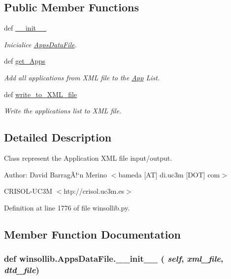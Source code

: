 \subsection*{Public Member Functions}
\begin{CompactItemize}
\item 
def \hyperlink{classwinsollib_1_1AppsDataFile_c1fe263619352c8a85a48a3ba16a60e2}{\_\-\_\-init\_\-\_\-}
\begin{CompactList}\small\item\em Inicialice \hyperlink{classwinsollib_1_1AppsDataFile}{Apps\-Data\-File}. \item\end{CompactList}\item 
def \hyperlink{classwinsollib_1_1AppsDataFile_17b0352842a241f33a0d597a0971a388}{get\_\-Apps}
\begin{CompactList}\small\item\em Add all applications from XML file to the \hyperlink{classwinsollib_1_1App}{App} List. \item\end{CompactList}\item 
def \hyperlink{classwinsollib_1_1AppsDataFile_03308e0dfa313b1163d8cbafd77a8353}{write\_\-to\_\-XML\_\-file}
\begin{CompactList}\small\item\em Write the applications list to XML file. \item\end{CompactList}\end{CompactItemize}


\subsection{Detailed Description}
Class represent the Application XML file input/output. 

\begin{Desc}
\item[Author:]David Barrag\~{A}!`n Merino $<$bameda \mbox{[}AT\mbox{]} di.uc3m \mbox{[}DOT\mbox{]} com$>$ 

CRISOL-UC3M $<$htp://crisol.uc3m.es$>$ \end{Desc}




Definition at line 1776 of file winsollib.py.

\subsection{Member Function Documentation}
\hypertarget{classwinsollib_1_1AppsDataFile_c1fe263619352c8a85a48a3ba16a60e2}{
\subsubsection[\_\-\_\-init\_\-\_\-]{\setlength{\rightskip}{0pt plus 5cm}def winsollib.Apps\-Data\-File.\_\-\_\-init\_\-\_\- ( {\em self},  {\em xml\_\-file},  {\em dtd\_\-file})}}
\label{classwinsollib_1_1AppsDataFile_c1fe263619352c8a85a48a3ba16a60e2}


